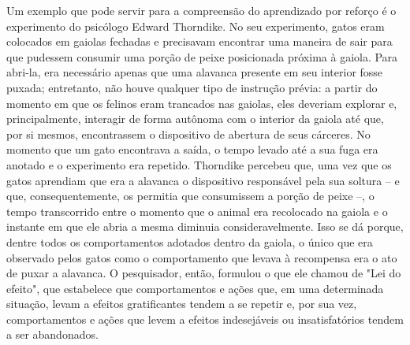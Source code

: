 \documentclass[cic,tc]{iiufrgs}
\begin{document}
Um exemplo que pode servir para a compreensão do aprendizado por reforço é o experimento do psicólogo Edward Thorndike.
No seu experimento, gatos eram colocados em gaiolas fechadas e precisavam encontrar uma maneira de sair para que pudessem
consumir uma porção de peixe posicionada próxima à gaiola. Para abri-la, era necessário apenas que uma alavanca presente em
seu interior fosse puxada; entretanto, não houve qualquer tipo de instrução prévia: a partir do momento em que os felinos
eram trancados nas gaiolas, eles deveriam explorar e, principalmente, interagir de forma autônoma com o interior da gaiola até que, por si mesmos,
encontrassem o dispositivo de abertura de seus cárceres. No momento que um gato encontrava a saída, o tempo levado até a sua fuga era anotado
 e o experimento era repetido.
Thorndike percebeu que, uma vez que os gatos aprendiam que era a alavanca o dispositivo responsável pela sua
soltura – e que, consequentemente, os permitia que consumissem a porção de peixe –, o tempo transcorrido entre o momento
que o animal era recolocado na gaiola e o instante em que ele abria a mesma diminuia consideravelmente. Isso se dá porque,
dentre todos os comportamentos adotados dentro da gaiola, o único que era observado pelos gatos como o comportamento que
levava à recompensa era o ato de puxar a alavanca. O pesquisador, então, formulou o que ele chamou de "Lei do efeito",
que estabelece que comportamentos e ações que, em uma determinada situação, levam a efeitos gratificantes tendem a se
repetir e, por sua vez, comportamentos e ações que levem a efeitos indesejáveis ou insatisfatórios tendem a ser abandonados.

\end{document}
